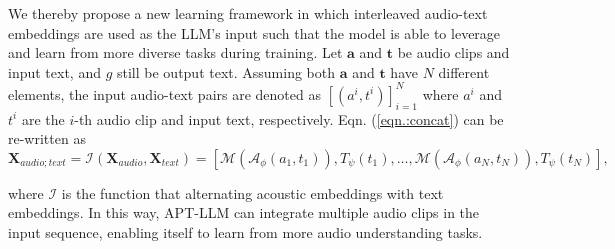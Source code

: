 We thereby propose a new learning framework in which interleaved audio-text embeddings are used as the LLM's input such that the model is able to leverage and learn from more diverse tasks during training. Let $\mathbf{a}$ and $\mathbf{t}$ be audio clips and input text, and $g$ still be output text. Assuming both $\mathbf{a}$ and $\mathbf{t}$ have $N$ different elements, the input audio-text pairs are denoted as $[(a^i, t^i)]_{i=1}^N$ where $a^i$ and $t^i$ are the $i$-th audio clip and input text, respectively. Eqn. (\ref{eqn.:concat}) can be re-written as
\begin{equation} \label{eqn.:interleave}
    \mathbf{X}_{audio;text}\!=\!\mathcal{I}(\mathbf{X}_{audio}, \mathbf{X}_{text}) = [\mathcal{M}(\mathcal{A}_{\phi}(a_{1}, t_{1})), T_{\psi}(t_{1}), \ldots, \mathcal{M}(\mathcal{A}_{\phi}(a_{N}, t_{N})), T_{\psi}(t_{N})],
\end{equation}

where $\mathcal{I}$ is the function that alternating acoustic embeddings with text embeddings. In this way, APT-LLM can integrate multiple audio clips in the input sequence, enabling itself to learn from more audio understanding tasks.

